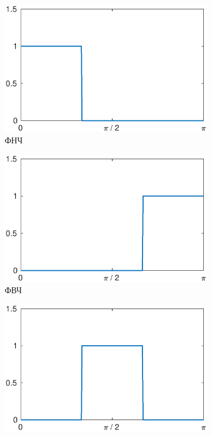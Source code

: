 \documentclass[a4paper,14pt]{extarticle}
\begin{document}
\begin{figure}[H]
\centering
\begin{subfigure}[b]{0.49\textwidth}
\includegraphics[width=1\textwidth]{lpf.eps}
\captionsetup{justification=centering,margin=1cm}
\caption{ФНЧ}
\end{subfigure}
\begin{subfigure}[b]{0.49\textwidth}
\includegraphics[width=1\textwidth]{hpf.eps}
\captionsetup{justification=centering,margin=1cm}
\caption{ФВЧ}
\end{subfigure}
\begin{subfigure}[b]{0.49\textwidth}
\includegraphics[width=1\textwidth]{bpf.eps}

\end{subfigure}
\end{figure}
\end{document}
